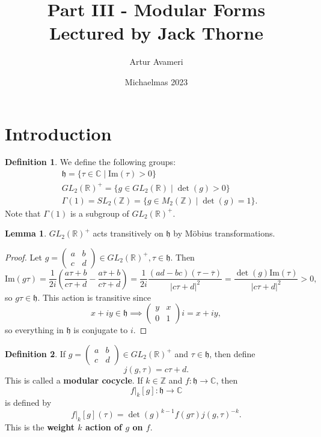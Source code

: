 \documentclass{article}
\title{Part III - Modular Forms
    \\ \large
    Lectured by Jack Thorne
}
\author{Artur Avameri}
\date{Michaelmas 2023}
\theoremstyle{definition}
\newtheorem{lemma}[theorem]{Lemma}
\newtheorem{defn}{Definition}[section]
\begin{document}
\maketitle
\tableofcontents
\newpage

\section{Introduction}


\begin{defn}
    We define the following groups:
    \begin{align*}
        &\mathfrak{h} = \{\tau \in \mathbb{C} \mid \text{Im}(\tau)>0\}\\
        &GL_2(\mathbb{R})^{+} = \{g \in GL_2(\mathbb{R}) \mid \det(g)>0\}\\
        &\Gamma(1) = SL_2(\mathbb{Z}) = \{g \in M_2(\mathbb{Z}) \mid  \det(g)=1\} .
    \end{align*}
    Note that $\Gamma(1)$ is a subgroup of $GL_2(\mathbb{R})^+$.
\end{defn}
\begin{lemma}
    $GL_2(\mathbb{R})^+$ acts transitively on $\mathfrak{h}$ by Möbius transformations.
\end{lemma}
\begin{proof}
    Let $g = \begin{pmatrix} a & b\\c&d \end{pmatrix} \in GL_2(\mathbb{R})^+, \tau \in \mathfrak{h}$. Then \[
    \text{Im}(g \tau) = \frac{1}{2i}\left(\frac{a \tau + b}{c \tau + d} - \frac{a \overline{\tau}+ b}{c \overline{\tau } + d} \right) = \frac{1}{2i} \frac{(ad-bc)(\tau - \overline{\tau})}{|c \tau + d|^2} = \frac{\det(g) \text{Im}(\tau)}{|c \tau + d |^2} > 0,
    \]
    so $g \tau \in \mathfrak{h}$. This action is transitive since \[
    x + iy  \in \mathfrak{h} \implies \begin{pmatrix} y & x \\ 0 & 1 \end{pmatrix} i  = x + iy,
    \]
    so everything in $\mathfrak{h}$ is conjugate to $i$.   
\end{proof}
\begin{defn}
    If $g = \begin{pmatrix} a & b\\ c & d\end{pmatrix}\in GL_2(\mathbb{R})^+$ and $\tau \in \mathfrak{h}$, then define \[
    j(g, \tau) =  c \tau + d.
    \]
    This is called a \textbf{modular cocycle}.
    If $k \in \mathbb{Z}$ and $f : \mathfrak{h} \to \mathbb{C}$, then \[
    f |_k[g]: \mathfrak{h} \to \mathbb{C}
    \]
    is defined by \[
    f |_k[g](\tau) = \det(g)^{k-1} f(g \tau) j(g, \tau)^{-k}.
    \]
    This is the \textbf{weight $k$ action of $g$ on $f$}.
\end{defn}
\end{document}
